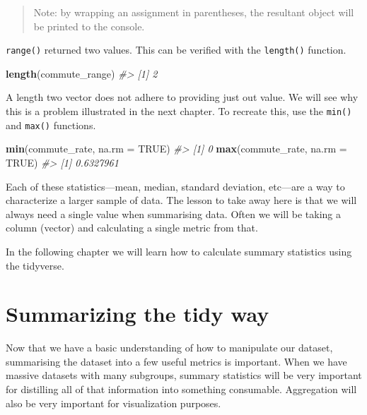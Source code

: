 \documentclass[
]{book}
\newenvironment{Shaded}{\begin{snugshade}}{\end{snugshade}}
\newcommand{\CommentTok}[1]{\textcolor[rgb]{0.56,0.35,0.01}{\textit{#1}}}
\newcommand{\DataTypeTok}[1]{\textcolor[rgb]{0.13,0.29,0.53}{#1}}
\newcommand{\KeywordTok}[1]{\textcolor[rgb]{0.13,0.29,0.53}{\textbf{#1}}}
\newcommand{\NormalTok}[1]{#1}
\newcommand{\OtherTok}[1]{\textcolor[rgb]{0.56,0.35,0.01}{#1}}
\begin{document}
\begin{quote}
Note: by wrapping an assignment in parentheses, the resultant object will be printed to the console.
\end{quote}

\texttt{range()} returned two values. This can be verified with the \texttt{length()} function.

\begin{Shaded}
\begin{Highlighting}[]
\KeywordTok{length}\NormalTok{(commute\_range)}
\CommentTok{\#\textgreater{} [1] 2}
\end{Highlighting}
\end{Shaded}

A length two vector does not adhere to providing just out value. We will see why this is a problem illustrated in the next chapter. To recreate this, use the \texttt{min()} and \texttt{max()} functions.

\begin{Shaded}
\begin{Highlighting}[]
\KeywordTok{min}\NormalTok{(commute\_rate, }\DataTypeTok{na.rm =} \OtherTok{TRUE}\NormalTok{)}
\CommentTok{\#\textgreater{} [1] 0}
\KeywordTok{max}\NormalTok{(commute\_rate, }\DataTypeTok{na.rm =} \OtherTok{TRUE}\NormalTok{)}
\CommentTok{\#\textgreater{} [1] 0.6327961}
\end{Highlighting}
\end{Shaded}

Each of these statistics---mean, median, standard deviation, etc---are a way to characterize a larger sample of data. The lesson to take away here is that we will always need a single value when summarising data. Often we will be taking a column (vector) and calculating a single metric from that.

In the following chapter we will learn how to calculate summary statistics using the tidyverse.

\hypertarget{summarizing-the-tidy-way}{%
\chapter{Summarizing the tidy way}\label{summarizing-the-tidy-way}}

Now that we have a basic understanding of how to manipulate our dataset, summarising the dataset into a few useful metrics is important. When we have massive datasets with many subgroups, summary statistics will be very important for distilling all of that information into something consumable. Aggregation will also be very important for visualization purposes.
\end{document}
